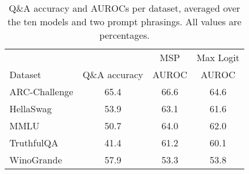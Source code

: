 \begin{table}
\centering
\small
\caption{Q\&A accuracy and AUROCs per dataset, averaged over the ten models and two prompt phrasings. All values are percentages.}
\label{tab:dataset}
\begin{tabular}{lccc}
\toprule
& & MSP & Max Logit\\ 
Dataset & Q\&A accuracy & AUROC & AUROC\\ \midrule
ARC-Challenge & 65.4 & 66.6 & 64.6\\
HellaSwag & 53.9 & 63.1 & 61.6\\
MMLU & 50.7 & 64.0 & 62.0\\
TruthfulQA & 41.4 & 61.2 & 60.1\\
WinoGrande & 57.9 & 53.3 & 53.8\\
\bottomrule
\end{tabular}
\end{table}

